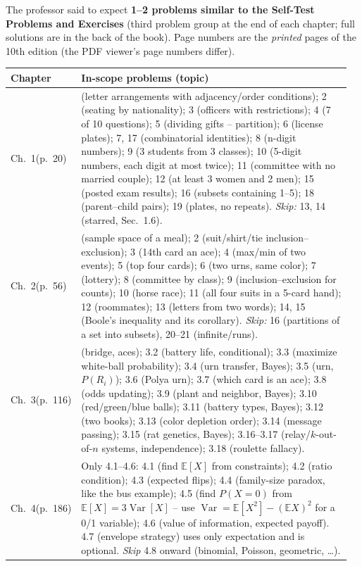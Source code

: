 \documentclass[11pt]{article}
\newcommand{\E}{\mathbb{E}}
\newcommand{\Var}{\operatorname{Var}}
\begin{document}
The professor said to expect \textbf{1--2 problems similar to the Self-Test Problems and Exercises} (third problem group at the end of each chapter; full solutions are in the back of the book). Page numbers are the \emph{printed} pages of the 10th edition (the PDF viewer's page numbers differ).

\begin{center}
\renewcommand{\arraystretch}{1.25}
\begin{tabular}{@{}>{\raggedright\arraybackslash}p{0.16\linewidth}>{\raggedright\arraybackslash}p{0.80\linewidth}@{}}
\toprule
\textbf{Chapter} & \textbf{In-scope problems (topic)}\\\midrule
Ch.\ 1\newline (p.\ 20) & 1 (letter arrangements with adjacency/order conditions); 2 (seating by nationality); 3 (officers with restrictions); 4 (7 of 10 questions); 5 (dividing gifts -- partition); 6 (license plates); 7, 17 (combinatorial identities); 8 (n-digit numbers); 9 (3 students from 3 classes); 10 (5-digit numbers, each digit at most twice); 11 (committee with no married couple); 12 (at least 3 women and 2 men); 15 (posted exam results); 16 (subsets containing 1--5); 18 (parent--child pairs); 19 (plates, no repeats). \emph{Skip:} 13, 14 (starred, Sec.\ 1.6).\\
Ch.\ 2\newline (p.\ 56) & 1 (sample space of a meal); 2 (suit/shirt/tie inclusion--exclusion); 3 (14th card an ace); 4 (max/min of two events); 5 (top four cards); 6 (two urns, same color); 7 (lottery); 8 (committee by class); 9 (inclusion--exclusion for counts); 10 (horse race); 11 (all four suits in a 5-card hand); 12 (roommates); 13 (letters from two words); 14, 15 (Boole's inequality and its corollary). \emph{Skip:} 16 (partitions of a set into subsets), 20--21 (infinite/runs).\\
Ch.\ 3\newline (p.\ 116) & 3.1 (bridge, aces); 3.2 (battery life, conditional); 3.3 (maximize white-ball probability); 3.4 (urn transfer, Bayes); 3.5 (urn, $P(R_i)$); 3.6 (Polya urn); 3.7 (which card is an ace); 3.8 (odds updating); 3.9 (plant and neighbor, Bayes); 3.10 (red/green/blue balls); 3.11 (battery types, Bayes); 3.12 (two books); 3.13 (color depletion order); 3.14 (message passing); 3.15 (rat genetics, Bayes); 3.16--3.17 (relay/$k$-out-of-$n$ systems, independence); 3.18 (roulette fallacy).\\
Ch.\ 4\newline (p.\ 186) & Only 4.1--4.6: 4.1 (find $\E[X]$ from constraints); 4.2 (ratio condition); 4.3 (expected flips); 4.4 (family-size paradox, like the bus example); 4.5 (find $P(X=0)$ from $\E[X]=3\Var[X]$ -- use $\Var=\E[X^2]-(\E X)^2$ for a 0/1 variable); 4.6 (value of information, expected payoff). 4.7 (envelope strategy) uses only expectation and is optional. \emph{Skip} 4.8 onward (binomial, Poisson, geometric, \dots).\\\bottomrule
\end{tabular}
\end{center}
\end{document}

